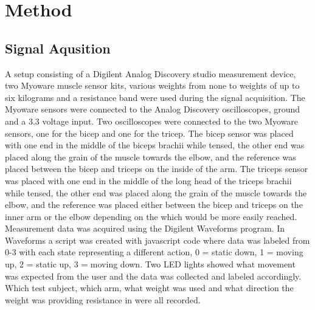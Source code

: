 \section{Method}
\label{section:method}



\subsection{Signal Aqusition}
A setup consisting of a Digilent Analog Discovery studio measurement device, two Myoware muscle sensor 
kits, various weights from none to weights of up to six kilograms and a resistance 
band were used during the signal acquisition. The Myoware sensors were connected to the Analog Discovery 
oscilloscopes, ground and a 3.3 voltage input. Two oscilloscopes were connected to the two Myoware 
sensors, one for the bicep and one for the tricep. The bicep sensor was placed with one end in the 
middle of the biceps brachii while tensed, the other end was placed along the grain of the muscle 
towards the elbow, and the reference was placed between the bicep and triceps on the inside of the arm. 
The triceps sensor was placed with one end in the middle of the long head of the triceps brachii while 
tensed, the other end was placed along the grain of the muscle towards the elbow, and the reference was 
placed either between the bicep and triceps on the inner arm or the elbow depending on the which would 
be more easily reached. Measurement data was acquired using the Digilent Waveforms program. In Waveforms a 
script was created with javascript code where data was labeled from 0-3 with each state representing a 
different action, 0 = static down, 1 = moving up, 2 = static up, 3 = moving down. Two LED lights showed what 
movement was expected from the user and the data was collected and labeled accordingly. Which test subject, 
which arm, what weight was used and what direction the weight was providing resistance in were all recorded.


